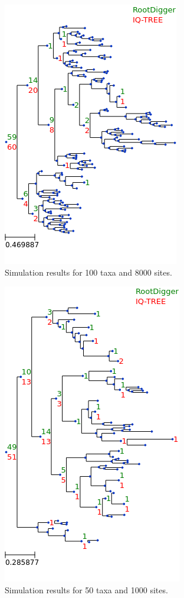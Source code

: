 \documentclass{article}
\begin{document}
\begin{figure}
  \includegraphics{figs/sim_results/100_8000.png}
  \caption{Simulation results for 100 taxa and 8000
  sites. \label{fig:sim-results-100t-8000s}}
\end{figure}

\begin{figure}
  \includegraphics{figs/sim_results/50_1000.png}
  \caption{Simulation results for 50 taxa and 1000
  sites. \label{fig:sim-results-50t-1000s}}
\end{figure}
\end{document}
